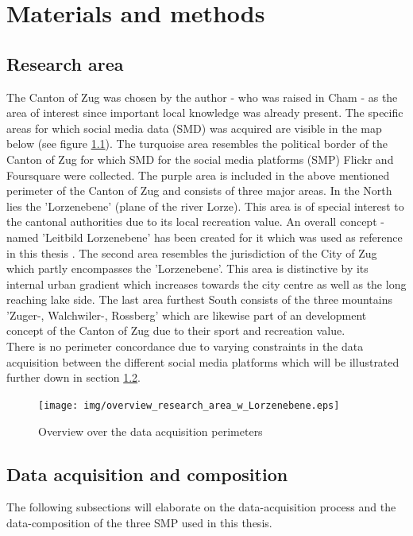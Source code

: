 \chapter{Materials and methods} \label{material_methods}

\section{Research area} \label{research_area}
The Canton of Zug was chosen by the author - who was raised in Cham - as the area of interest since important local knowledge was already present. The specific areas for which social media data (SMD) was acquired are visible in the map below (see figure \ref{fig:research_area}). The turquoise area resembles the political border of the Canton of Zug for which SMD for the social media platforms (SMP) Flickr and Foursquare were collected. The purple area is included in the above mentioned perimeter of the Canton of Zug and consists of three major areas. In the North lies the 'Lorzenebene' (plane of the river Lorze). This area is of special interest to the cantonal authorities due to its local recreation value. An overall concept - named 'Leitbild Lorzenebene' has been created for it which was used as reference in this thesis \cite{BaudirektiondesKantonsZug2012LeitbildBericht}. The second area resembles the jurisdiction of the City of Zug which partly encompasses the 'Lorzenebene'. This area is distinctive by its internal urban gradient which increases towards the city centre as well as the long reaching lake side. The last area furthest South consists of the three mountains 'Zuger-, Walchwiler-, Rossberg' which are likewise part of an development concept \cite{Berchtold2011EntwicklungsleitbildRossberg} of the Canton of Zug due to their sport and recreation value. \\
There is no perimeter concordance due to varying constraints in the data acquisition between the different social media platforms which will be illustrated further down in section \ref{data_acquisition}.

\begin{figure}[h]
   \centering
   \texttt{[image: img/overview\_research\_area\_w\_Lorzenebene.eps]}
   \caption{Overview over the data acquisition perimeters}
   \label{fig:research_area}
\end{figure}


\section{Data acquisition and composition} \label{data_acquisition}
The following subsections will elaborate on the data-acquisition process and the data-composition of the three SMP used in this thesis. 


